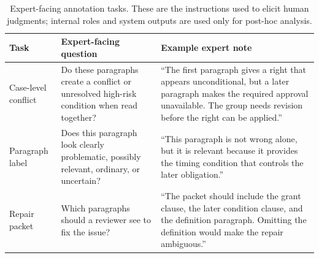 \documentclass[11pt]{article}
\begin{document}
\begin{table}[t]
\centering
\small
\setlength{\tabcolsep}{4pt}
\begin{tabular}{p{}p{}p{}}
\toprule
Task & Expert-facing question & Example expert note \\
\midrule
Case-level conflict & Do these paragraphs create a conflict or unresolved high-risk condition when read together? & ``The first paragraph gives a right that appears unconditional, but a later paragraph makes the required approval unavailable.  The group needs revision before the right can be applied.'' \\
Paragraph label & Does this paragraph look clearly problematic, possibly relevant, ordinary, or uncertain? & ``This paragraph is not wrong alone, but it is relevant because it provides the timing condition that controls the later obligation.'' \\
Repair packet & Which paragraphs should a reviewer see to fix the issue? & ``The packet should include the grant clause, the later condition clause, and the definition paragraph.  Omitting the definition would make the repair ambiguous.'' \\
\bottomrule
\end{tabular}
\caption{Expert-facing annotation tasks.  These are the instructions used to elicit human judgments; internal roles and system outputs are used only for post-hoc analysis.}
\label{tab:expert_protocol}
\end{table}
\end{document}
